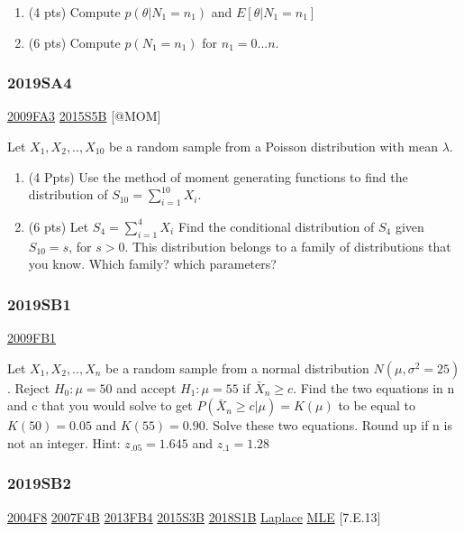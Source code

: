 \documentclass[6pt,twocolumn,Portrait]{article}
\begin{document}
\begin{enumerate}
\def\labelenumi{(\alph{enumi})}
\item
  (4 pts) Compute \(p(\theta|N_1=n_1)\) and \(E[\theta|N_1=n_1]\)
\item
  (6 pts) Compute \(p(N_1=n_1)\) for \(n_1=0...n\).
\end{enumerate}

\hypertarget{sa4-3}{%
\subsubsection{2019SA4}\label{sa4-3}}

\protect\hyperlink{fa3}{2009FA3} \protect\hyperlink{s5b-1}{2015S5B}
{[}@MOM{]}

Let \(X_1,X_2,..,X_{10}\) be a random sample from a Poisson distribution
with mean \(\lambda\).

\begin{enumerate}
\def\labelenumi{(\alph{enumi})}
\item
  (4 Ppts) Use the method of moment generating functions to find the
  distribution of \(S_{10}=\sum^{10}_{i=1} X_i\).
\item
  (6 pts) Let \(S_4=\sum_{i=1}^4X_i\) Find the conditional distribution
  of \(S_4\) given \(S_{10}=s\), for \(s>0\). This distribution belongs
  to a family of distributions that you know. Which family? which
  parameters?
\end{enumerate}

\hypertarget{sb1-3}{%
\subsubsection{2019SB1}\label{sb1-3}}

\protect\hyperlink{fb1}{2009FB1}

Let \(X_1,X_2,..,X_n\) be a random sample from a normal distribution
\(N(\mu,\sigma^2=25)\). Reject \(H_0:\mu=50\) and accept \(H_1:\mu=55\)
if \(\bar X_n\ge c\). Find the two equations in n and c that you would
solve to get \(P(\bar X_n\ge c|\mu)=K(\mu)\) to be equal to
\(K(50)=0.05\) and \(K(55)=0.90\). Solve these two equations. Round up
if n is not an integer. Hint: \(z_{.05}=1.645\) and \(z_{.1}=1.28\)

\hypertarget{sb2-3}{%
\subsubsection{2019SB2}\label{sb2-3}}

\protect\hyperlink{f8-2}{2004F8} \protect\hyperlink{f4b}{2007F4B}
\protect\hyperlink{fb4-2}{2013FB4} \protect\hyperlink{s3b-1}{2015S3B}
\protect\hyperlink{s1b-2}{2018S1B} \protect\hyperlink{Laplace}{Laplace}
\protect\hyperlink{MLE}{MLE} {[}7.E.13{]}\protect\hyperlink{section}{}
\end{document}
